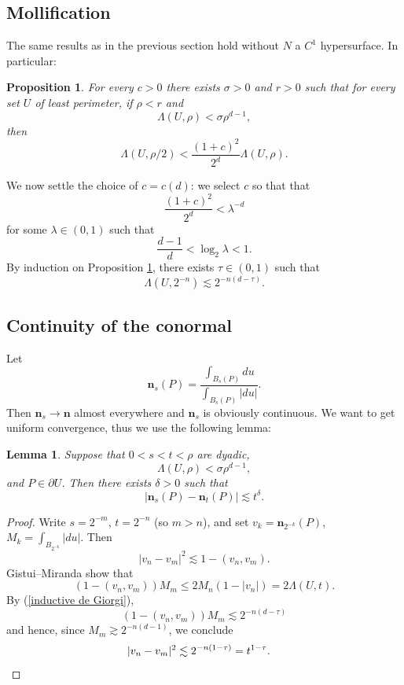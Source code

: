 \documentclass[reqno,12pt,letterpaper]{amsart}
\newcommand{\normal}{\mathbf n}
\newtheorem{lemma}[theorem]{Lemma}
\newtheorem{proposition}[theorem]{Proposition}
\theoremstyle{definition}
\numberwithin{equation}{section}
\begin{document}
\subsection{Mollification}
The same results as in the previous section hold without $N$ a $C^1$ hypersurface.
In particular:

\begin{proposition}\label{de Giorgi}
For every $c > 0$ there exists $\sigma > 0$ and $r > 0$ such that for every set $U$ of least perimeter, if
$\rho < r$ and
$$\Lambda(U, \rho) < \sigma \rho^{d - 1},$$
then
$$\Lambda(U, \rho/2) < \frac{(1 + c)^2}{2^d} \Lambda(U, \rho).$$
\end{proposition}

We now settle the choice of $c = c(d)$: we select $c$ so that that
$$\frac{(1 + c)^2}{2^d} < \lambda^{-d}$$
for some $\lambda \in (0, 1)$ such that
$$\frac{d - 1}{d} < \log_2 \lambda < 1.$$
By induction on Proposition \ref{de Giorgi}, there exists $\tau \in (0, 1)$ such that
\begin{equation}\label{inductive de Giorgi}
\Lambda(U, 2^{-n}) \lesssim 2^{-n(d - \tau)}.
\end{equation}

\subsection{Continuity of the conormal}
Let
$$\normal_s(P) = \frac{\int_{B_s(P)} du}{\int_{B_s(P)} |du|}.$$
Then $\normal_s \to \normal$ almost everywhere and $\normal_s$ is obviously continuous.
We want to get uniform convergence, thus we use the following lemma:

\begin{lemma}
Suppose that $0 < s < t < \rho$ are dyadic,
$$\Lambda(U, \rho) < \sigma \rho^{d - 1},$$
and $P \in \partial U$.
Then there exists $\delta > 0$ such that
$$|\normal_s(P) - \normal_t(P)| \lesssim t^\delta.$$
\end{lemma}
\begin{proof}
Write $s = 2^{-m}$, $t = 2^{-n}$ (so $m > n$), and set $v_k = \normal_{2^{-k}}(P)$, $M_k = \int_{B_{2^{-k}}} |du|$.
Then
$$|v_n - v_m|^2 \lesssim 1 - (v_n, v_m).$$
Gistui--Miranda show that
$$(1 - (v_n, v_m))M_m \leq 2M_n(1 - |v_n|) = 2\Lambda(U, t).$$
By (\ref{inductive de Giorgi}),
$$(1 - (v_n, v_m))M_m \lesssim 2^{-n(d - \tau)}$$
and hence, since $M_m \gtrsim 2^{-n(d - 1)}$, we conclude
\begin{align*}
|v_n - v_m|^2 &\lesssim 2^{-n(1 - \tau)} = t^{1 - \tau}. \qedhere
\end{align*}
\end{proof}
\end{document}

